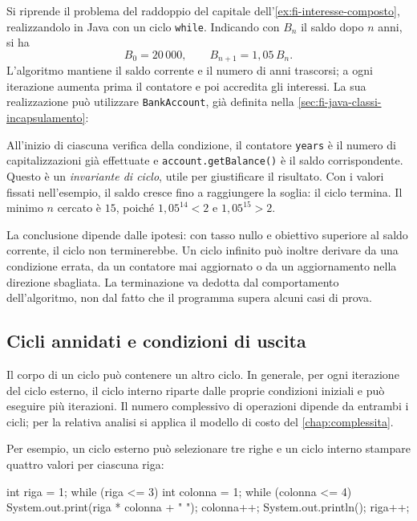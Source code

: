Si riprende il problema del raddoppio del capitale
dell'\cref{ex:fi-interesse-composto}, realizzandolo in Java
con un ciclo \texttt{while}. Indicando con \(B_n\) il saldo
dopo \(n\) anni, si ha
\[
  B_0=20\,000,\qquad B_{n+1}=1{,}05\,B_n.
\]
L'algoritmo mantiene il saldo corrente e il numero di anni
trascorsi; a ogni iterazione aumenta prima il contatore e poi
accredita gli interessi. La sua realizzazione può utilizzare
\texttt{BankAccount}, già definita nella
\cref{sec:fi-java-classi-incapsulamento}:



All'inizio di ciascuna verifica della condizione, il contatore
\texttt{years} è il numero di capitalizzazioni già effettuate e
\texttt{account.getBalance()} è il saldo corrispondente. Questo
è un \emph{invariante di ciclo}, utile per giustificare il
risultato. Con i valori fissati nell'esempio, il saldo cresce fino a
raggiungere la soglia: il ciclo termina. Il minimo \(n\) cercato è
\(15\), poiché \(1{,}05^{14}<2\) e \(1{,}05^{15}>2\).

La conclusione dipende dalle ipotesi: con tasso nullo e
obiettivo superiore al saldo corrente, il ciclo non terminerebbe.
Un ciclo infinito può inoltre derivare da una condizione errata,
da un contatore mai aggiornato o da un aggiornamento nella direzione
sbagliata. La terminazione va dedotta dal comportamento dell'algoritmo,
non dal fatto che il programma supera alcuni casi di prova.

\subsection{Cicli annidati e condizioni di uscita}
\label{sec:fi-java-cicli-while-annidati}

Il corpo di un ciclo può contenere un altro ciclo. In generale,
per ogni iterazione del ciclo esterno, il ciclo interno riparte
dalle proprie condizioni iniziali e può eseguire più iterazioni.
Il numero complessivo di operazioni dipende da entrambi i cicli;
per la relativa analisi si applica il modello di costo del
\cref{chap:complessita}.

Per esempio, un ciclo esterno può selezionare tre righe e un ciclo
interno stampare quattro valori per ciascuna riga:

\begin{unipdcode}[language=Java]
int riga = 1;
while (riga <= 3) {
    int colonna = 1;
    while (colonna <= 4) {
        System.out.print(riga * colonna + " ");
        colonna++;
    }
    System.out.println();
    riga++;
}
\end{unipdcode}

